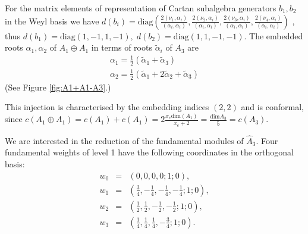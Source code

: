 \documentclass[a4paper,12pt]{article}
\theoremstyle{definition} \newtheorem{Def}{Definition}
\begin{document}
For the matrix elements of representation of Cartan subalgebra generators $b_1,b_2$ in
the Weyl basis we have $d(b_i)=\mathrm{diag}\left(\frac{2(\nu_1,\alpha_i)}
{(\alpha_i,\alpha_i)},\frac{2(\nu_2,\alpha_i)}{(\alpha_i,\alpha_i)},
\frac{2(\nu_3,\alpha_i)}{(\alpha_i,\alpha_i)},\frac{2(\nu_4,\alpha_i)}
{(\alpha_i,\alpha_i)}\right)$ \cite{vasilevich1986method},
thus $d(b_1)=\mathrm{diag}(1,-1,1,-1),\; d(b_2)=\mathrm{diag}(1,1,-1,-1)$.
The embedded roots $\alpha_1,\alpha_2$ of $A_1\oplus A_1$ in terms of roots $\tilde{\alpha}_i$ of $A_3$ are
\begin{equation}
  \label{eq:37}
  \begin{array}{l}
     \alpha_1=\frac{1}{2}(\tilde{\alpha}_1+\tilde{\alpha}_3)\\
     \alpha_2=\frac{1}{2}(\tilde{\alpha}_1+2\tilde{\alpha}_2+\tilde{\alpha}_3)
  \end{array}
\end{equation}
(See Figure \ref{fig:A1+A1-A3}.)

This injection is characterised by the embedding indices $(2,2)$ and is conformal,
since $c(A_1\oplus A_1)=c(A_1)+c(A_1)=2\frac{x_e \mathrm{dim}(A_1)}{x_e+2}=\frac{\mathrm{dim}A_3}{5}=c(A_3)$.

We are interested in the reduction of the fundamental modules of $\hat A_3$.
Four fundamental weights of level 1 have the following coordinates in the orthogonal basis: 
\begin{equation}
  \begin{array}{lll}
     w_0 & = & (0,0,0,0;1;0),\\
     w_1 & = & (\frac{3}{4},-\frac{1}{4},-\frac{1}{4},-\frac{1}{4}; 1; 0),\\
     w_2 & = & (\frac{1}{2},\frac{1}{2},-\frac{1}{2},-\frac{1}{2}; 1; 0),\\
     w_3 & = & (\frac{1}{4},\frac{1}{4},\frac{1}{4},-\frac{3}{4}; 1; 0). \\
  \end{array}
\end{equation}
\end{document}

